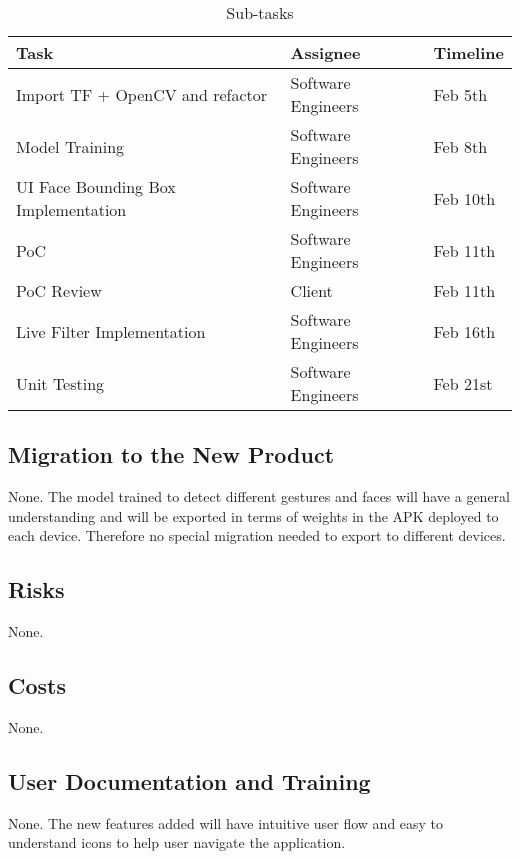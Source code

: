 \documentclass[12pt, titlepage]{article}
\begin{document}
\begin{table}[h!]
\begin{center}
\begin{tabular}{|l|l|l|}
\hline
Task & Assignee & Timeline  \\\hline
Import TF + OpenCV and refactor & Software Engineers &   Feb 5th  \\\hline
Model Training  &  Software Engineers  &  Feb 8th   \\\hline
UI Face Bounding Box Implementation  &  Software Engineers  &  Feb 10th   \\\hline
PoC  &  Software Engineers  &  Feb 11th   \\\hline
PoC Review  &  Client  &  Feb 11th   \\\hline
Live Filter Implementation  &  Software Engineers  &   Feb 16th  \\\hline
Unit Testing  &  Software Engineers  &   Feb 21st  \\\hline
\end{tabular}
\caption{\label{tab:table-name}Sub-tasks}
\end{center}
\end{table}


\subsection{Migration to the New Product}

None. The model trained to detect different gestures and faces will have a general understanding and will be exported in terms of weights in the APK deployed to each device. Therefore no special migration needed to export to different devices. 

\subsection{Risks}

None.

\subsection{Costs}

None.

\subsection{User Documentation and Training}

None. The new features added will have intuitive user flow and easy to understand icons to help user navigate the application.
\end{document}

